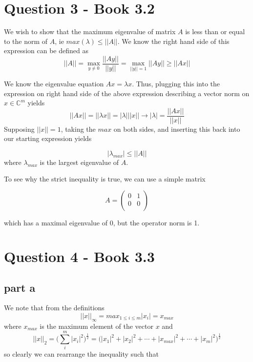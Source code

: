 \documentclass[a4paper,12pt]{article}
\begin{document}
\section{Question 3 - Book 3.2}
We wish to show that the maximum eigenvalue of matrix $A$ is less than or equal to the norm of $A$, ie $max(\lambda) \leq || A || $. We know the right hand side of this expression can be defined as
\begin{equation}
|| A || = \max_{y\neq 0} \frac{|| Ay||}{||y||} = \max_{||y||=1}|| Ay|| \geq || Ax ||
\end{equation}

We know the eigenvalue equation $Ax=\lambda x$. Thus, plugging this into the expression on right hand side of the above expression describing a vector norm on $x\in \mathbb{C}^m$ yields
\begin{equation}
|| Ax || = || \lambda x || = |\lambda | ||x|| \rightarrow |\lambda | = \frac{|| Ax ||}{|| x ||}
\end{equation}
Supposing $|| x || =1$, taking the $max$ on both sides, and inserting this back into our starting expression yields 

\begin{equation}
| \lambda_{max} | \leq || A ||
\end{equation}
 where $\lambda_{max}$ is the largest eigenvalue of $A$. %

To see why the strict inequality is true, we can use a simple matrix



\begin{equation}
A=\begin{pmatrix}
0&1  \\
0&0\\
\end{pmatrix}
\end{equation} 

which has a maximal eigenvalue of 0, but the operator norm is 1. 













\section{Question 4 - Book 3.3}
\subsection{part a}
We note that from the definitions
\begin{equation}
||x||_{\infty} = max_{1\leq i \leq m} |x_i | =x_{max}
\end{equation}
where $x_{max}$ is the maximum element of the vector $x$
and 
\begin{equation}
||x||_2 =\big( \sum_{i}^m |x_i|^2 \big)^{\frac{1}{2}} = \big( |x_1|^2+|x_2|^2+\cdots+|x_{max}|^2 + \cdots +|x_m|^2\big)^{\frac{1}{2}}
\end{equation}
so clearly we can rearrange the inequality such that
\end{document}
